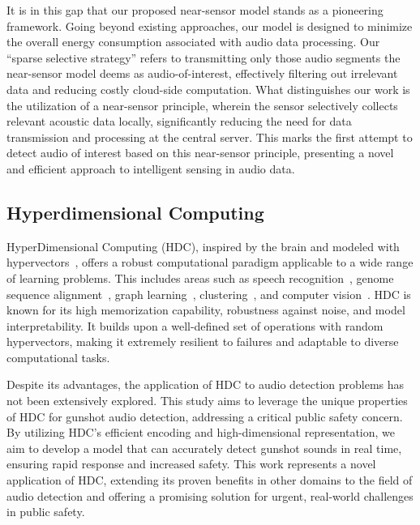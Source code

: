 It is in this gap that our proposed near-sensor model stands as a pioneering framework. Going beyond existing approaches, our model is designed to minimize the overall energy consumption associated with audio data processing. Our ``sparse selective strategy'' refers to transmitting only those audio segments the near-sensor model deems as audio-of-interest, effectively filtering out irrelevant data and reducing costly cloud-side computation. What distinguishes our work is the utilization of a near-sensor principle, wherein the sensor selectively collects relevant acoustic data locally, significantly reducing the need for data transmission and processing at the central server. This marks the first attempt to detect audio of interest based on this near-sensor principle, presenting a novel and efficient approach to intelligent sensing in audio data.


\subsection{Hyperdimensional Computing} 
HyperDimensional Computing (HDC), inspired by the brain and modeled with hypervectors~\cite{kanerva2009hyperdimensional}, offers a robust computational paradigm applicable to a wide range of learning problems. This includes areas such as speech recognition~\cite{imani2017voicehd}, genome sequence alignment~\cite{kim2020geniehd}, graph learning~\cite{kang2022relhd, nunes2022graphhd}, clustering~\cite{yun2023hyperdimensional}, and computer vision~\cite{hersche2022constrained, dutta2022hdnn, yun2024spatial}. HDC is known for its high memorization capability, robustness against noise, and model interpretability. It builds upon a well-defined set of operations with random hypervectors, making it extremely resilient to failures and adaptable to diverse computational tasks.

Despite its advantages, the application of HDC to audio detection problems has not been extensively explored. This study aims to leverage the unique properties of HDC for gunshot audio detection, addressing a critical public safety concern. By utilizing HDC's efficient encoding and high-dimensional representation, we aim to develop a model that can accurately detect gunshot sounds in real time, ensuring rapid response and increased safety. This work represents a novel application of HDC, extending its proven benefits in other domains to the field of audio detection and offering a promising solution for urgent, real-world challenges in public safety.

